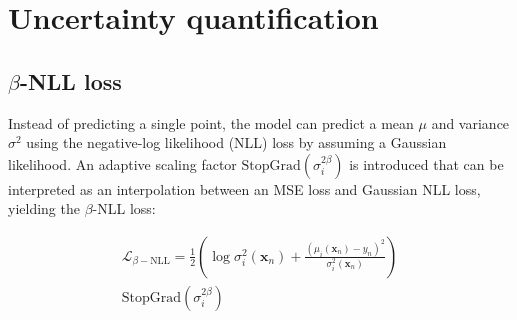  

\section{Uncertainty quantification}
\label{sec:uncertainty}

\subsection{$\beta$-NLL loss}

Instead of predicting a single point, the model can predict a mean $\mu$ and variance $\sigma^2$ using the negative-log likelihood (NLL) loss \cite{nix_estimating_1994,lakshminarayanan_simple_2017} by assuming a Gaussian likelihood. An adaptive scaling factor $\text{StopGrad}(\sigma_i^{2\beta})$ is introduced that can be interpreted as an interpolation between an MSE loss and Gaussian NLL loss, yielding the $\beta$-NLL loss:

	\begin{multline}	
	\mathcal{L}_{\beta-\text{NLL}} = \frac{1}{2}\left( \log{\sigma^2_i(\mathbf{x}_n)} +\frac{\left(\mu_i(\mathbf{x}_n) - y_n\right)^2}{\sigma^2_i (\mathbf{x}_n)} \right) \\ \text{StopGrad}\left(\sigma_i^{2\beta}\right)
	\label{eq:loss_beta-NLL}
	\end{multline}

